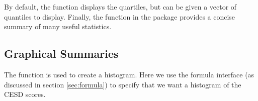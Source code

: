 \begin{knitrout}
\end{knitrout}


By default, the 
 function displays the quartiles, but can be given
a vector of quantiles to display.  Finally, the 
function in the  package provides a concise summary of 
many useful statistics.


\subsection{Graphical Summaries}
The  function is used to create a histogram.
Here we use the formula interface (as discussed in section \ref{sec:formula}) to
specify that we want a histogram of the CESD scores.

